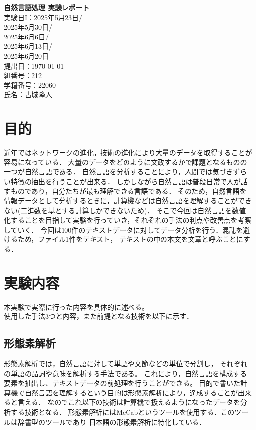 \documentclass[a4paper,11pt]{ltjsarticle}
\begin{document}
\begin{titlepage}
    \begin{center}
        \vspace*{2cm}
        {\LARGE \textbf{自然言語処理 実験レポート}}\\[2cm]
        {\large 実験日I：2025年5月23日/}\\[0.5cm]
        {\large 2025年5月30日/}\\[0.5cm]
        {\large 2025年6月6日/}\\[0.5cm]
        {\large 2025年6月13日/}\\[0.5cm]
        {\large 2025年6月20日}\\[0.5cm]
        {\large 提出日：\today}\\[1.5cm]
        {\large 組番号：212}\\[0.5cm]
        {\large 学籍番号：22060}\\[0.5cm]
        {\large 氏名：古城隆人}\\[2cm]
        \vfill
    \end{center}
\end{titlepage}

\section{目的}
近年ではネットワークの進化，技術の進化により大量のデータを取得することが容易になっている．
大量のデータをどのように文政するかで課題となるものの一つが自然言語である．
自然言語を分析することにより，人間では気づきずらい特徴の抽出を行うことが出来る．
しかしながら自然言語は普段日常で人が話すものであり，自分たちが最も理解できる言語である．
そのため，自然言語を情報データとして分析するときに，計算機などは自然言語を理解することができない(二進数を基とする計算しかできないため)．
そこで今回は自然言語を数値化することを目指して実験を行っていき，それぞれの手法の利点や改善点を考察していく．
今回は100件のテキストデータに対してデータ分析を行う．混乱を避けるため，ファイル1件をテキスト，
テキストの中の本文を文章と呼ぶことにする．
\section{実験内容}
本実験で実際に行った内容を具体的に述べる。\\
使用した手法3つと内容，また前提となる技術を以下に示す．
\subsection{形態素解析}
形態素解析では，自然言語に対して単語や文節などの単位で分割し，
それぞれの単語の品詞や意味を解析する手法である。
これにより，自然言語を構成する要素を抽出し、テキストデータの前処理を行うことができる。
目的で書いた計算機で自然言語を理解するという目的は形態素解析により，達成することが出来ると言える．
なのでこれ以下の技術は計算機で扱えるようになったデータを分析する技術となる．
形態素解析にはMeCabというツールを使用する．このツールは辞書型のツールであり
日本語の形態素解析に特化している．
\end{document}
